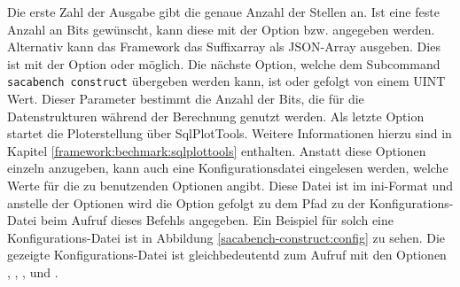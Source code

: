 {Die erste Zahl der Ausgabe gibt die genaue Anzahl der Stellen an.
Ist eine feste Anzahl an Bits gew{\"u}nscht, kann diese mit der Option  bzw.  angegeben werden.
Alternativ kann das Framework das Suffixarray als JSON-Array ausgeben. 
Dies ist mit der Option  oder  möglich.
Die nächste Option, welche dem Subcommand \texttt{sacabench construct} {\"u}bergeben werden kann, ist  oder  gefolgt von einem UINT Wert. 
Dieser Parameter bestimmt die Anzahl der Bits, die f{\"u}r die Datenstrukturen w{\"a}hrend der Berechnung genutzt werden.
Als letzte Option startet  die Ploterstellung über SqlPlotTools. 
Weitere Informationen hierzu sind in Kapitel \ref{framework:bechmark:sqlplottools} enthalten.
Anstatt diese Optionen einzeln anzugeben, kann auch eine Konfigurationsdatei eingelesen werden, welche Werte für die zu benutzenden Optionen angibt.
Diese Datei ist im ini-Format und anstelle der Optionen wird die Option  gefolgt zu dem Pfad zu der Konfigurations-Datei beim Aufruf dieses Befehls angegeben.
Ein Beispiel für solch eine Konfigurations-Datei ist in Abbildung \ref{sacabench-construct:config} zu sehen.
Die gezeigte Konfigurations-Datei ist gleichbedeutentd zum Aufruf mit den Optionen , , ,  und .
\par
}

